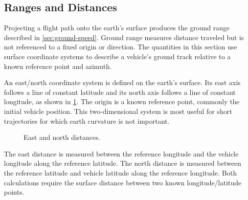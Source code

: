 \subsection{Ranges and Distances}\label{sec:ranges-distances}

Projecting a flight path onto the earth's surface produces the ground range described
in \cref{sec:ground-speed}. Ground range measures distance traveled but is
not referenced to a fixed origin or direction. The quantities in this section use
surface coordinate systems to describe a vehicle's ground track relative to a known
reference point and azimuth.


An east/north coordinate system is defined on the earth's surface. Its east axis
follows a line of constant latitude and its north axis follows a line of constant
longitude, as shown in \cref{fig:east-north-distances}. The origin is a known
reference point, commonly the initial vehicle position. This two-dimensional system
is most useful for short trajectories for which earth curvature is not important.

\begin{figure}[htbp]
  \centering
  \resizebox{0.82\linewidth}{!}{}
  \caption{East and north distances.}
  \label{fig:east-north-distances}
\end{figure}

The east distance is measured between the reference longitude and the vehicle
longitude along the reference latitude. The north distance is measured between the
reference latitude and vehicle latitude along the reference longitude. Both
calculations require the surface distance between two known longitude/latitude
points.


